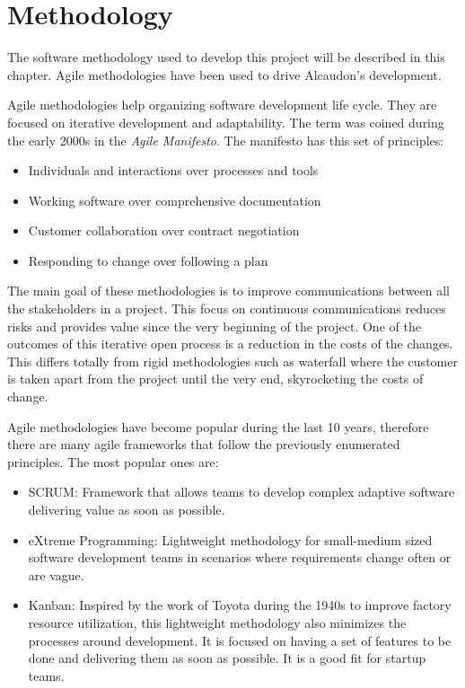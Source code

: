 \chapter{Methodology}
The software methodology used to develop this project will be described in this
chapter. Agile methodologies have been used to drive Alcaudon's development.

Agile methodologies help organizing software development life cycle. They are
focused on iterative development and adaptability. The term was coined during
the early 2000s in the \textit{Agile Manifesto}\cite{manifesto}. The manifesto
has this set of principles:

\begin{itemize}
\item Individuals and interactions over processes and tools
\item Working software over comprehensive documentation
\item Customer collaboration over contract negotiation
\item Responding to change over following a plan
\end{itemize}

The main goal of these methodologies is to improve communications between all
the stakeholders in a project. This focus on continuous communications reduces
risks and provides value since the very beginning of the project. One of the
outcomes of this iterative open process is a reduction in the costs of the
changes. This differs totally from rigid methodologies such as waterfall where
the customer is taken apart from the project until the very end, skyrocketing
the costs of change.

Agile methodologies have become popular during the last 10 years, therefore there
are many agile frameworks that follow the previously enumerated principles. The
most popular ones are:
\begin{itemize}
\item SCRUM\cite{scrum}: Framework that allows teams to develop complex
  adaptive software delivering value as soon as possible.
\item eXtreme Programming\cite{xp}: Lightweight methodology for small-medium
  sized software development teams in scenarios where requirements change often
  or are vague.
\item Kanban\cite{kanban}: Inspired by the work of Toyota during the 1940s to improve
  factory resource utilization, this lightweight methodology also minimizes the processes
  around development. It is focused on having a set of features to be done and delivering
  them as soon as possible. It is a good fit for startup teams.
\end{itemize}

